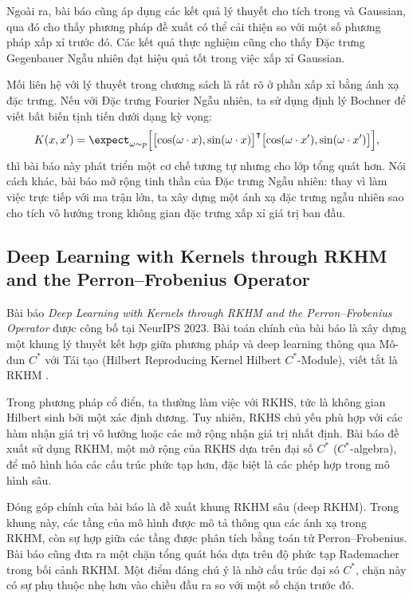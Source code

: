Ngoài ra, bài báo cũng áp dụng các kết quả lý thuyết cho  tích
trong và  Gaussian, qua đó cho thấy phương pháp đề xuất có thể cải
thiện so với một số phương pháp xấp xỉ  trước đó. Các kết quả thực
nghiệm cũng cho thấy Đặc trưng Gegenbauer Ngẫu nhiên đạt hiệu quả tốt trong
việc xấp xỉ  Gaussian.

Mối liên hệ với lý thuyết trong chương sách là rất rõ ở phần xấp xỉ
 bằng ánh xạ đặc trưng. Nếu với Đặc trưng Fourier Ngẫu nhiên, ta sử
dụng định lý Bochner để viết  bất biến tịnh tiến dưới dạng kỳ vọng:
\begin{equation}
  K(x,x') = \expect_{\omega \sim p}\Bigl[ \bigl[ \cos(\omega \cdot x),
    \sin(\omega \cdot x) \bigr ]^\intercal \bigl[ \cos(\omega
    \cdot x'), \sin(\omega \cdot x') \bigr ] \Bigr ],
\end{equation}
thì bài báo này phát triển một cơ chế tương tự nhưng cho lớp  tổng
quát hơn. Nói cách khác, bài báo mở rộng tinh thần của Đặc trưng Ngẫu nhiên:
thay vì làm việc trực tiếp với ma trận  lớn, ta xây dựng một ánh xạ
đặc trưng ngẫu nhiên sao cho tích vô hướng trong không gian đặc trưng xấp xỉ
giá trị  ban đầu.

\subsection{Deep Learning with Kernels through
RKHM and the Perron--Frobenius Operator}

Bài báo \emph{Deep Learning with Kernels through RKHM
and the Perron--Frobenius Operator} được công bố tại NeurIPS 2023. Bài toán
chính của bài báo là xây dựng một khung lý thuyết kết hợp giữa phương pháp
 và deep learning thông qua Mô-đun $C^*$ với  Tái tạo
(Hilbert Reproducing Kernel Hilbert $C^*$-Module), viết tắt là RKHM
\cite{hashimoto2023deeplearningkernelsrkhm}.

Trong phương pháp  cổ điển, ta thường làm việc với RKHS, tức là
không gian Hilbert sinh bởi một  xác định dương. Tuy nhiên, RKHS
chủ yếu phù hợp với các hàm nhận giá trị vô hướng hoặc các mở rộng
 nhận giá trị  nhất định. Bài báo đề xuất sử dụng RKHM,
một mở rộng của RKHS dựa trên đại số $C^*$ ($C^*$-algebra), để mô hình hóa các
cấu trúc phức tạp hơn, đặc biệt là các phép hợp trong mô hình sâu.

Đóng góp chính của bài báo là đề xuất khung RKHM sâu (deep RKHM). Trong khung
này, các tầng của mô hình được mô tả thông qua các ánh xạ trong RKHM, còn sự
hợp giữa các tầng được phân tích bằng toán tử Perron--Frobenius. Bài báo cũng
đưa ra một chặn tổng quát hóa dựa trên độ phức tạp Rademacher trong bối cảnh
RKHM. Một điểm đáng chú ý là nhờ cấu trúc đại só $C^*$, chặn này có sự phụ
thuộc nhẹ hơn vào chiều đầu ra so với một số chặn trước đó.

